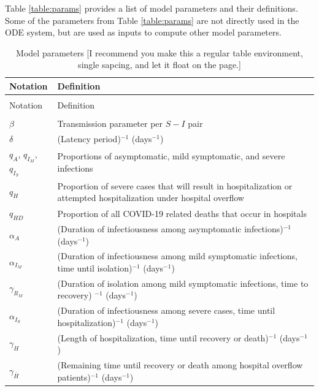 \documentclass[11pt]{article}
\newcommand{\comments}[1]{[\textcolor{red}{#1}]}
\begin{document}
Table \ref{table:params} provides a list of model parameters and their definitions. Some of the parameters from Table \ref{table:params} are not directly used in the ODE system, but are used as inputs to compute other model parameters. \\ 
\comments{Add the rest of parameters here, including intervention effects}

\begin{longtable} {p{} p{} }
	\caption{Model parameters [I recommend you make this a regular table environment, single sapcing, and let it float on the page.]} \\
	Notation & Definition \\[0.5em] \hline
	{} & {} \\
	\endfirsthead
	Notation & Definition  \\[0.5em] \hline
	\endhead
	{} & {}  \\[-1em]
	$\beta$ & Transmission parameter per $S-I$ pair \\[0.5em]
	$\delta$ & (Latency period)$^{-1}$ (days$^{-1}$) \\[0.5em]
	$q_A$, $q_{I_M}$, $q_{I_S}$  & Proportions of asymptomatic, mild symptomatic, and severe infections \\[0.5em]
	$q_H$ & Proportion of severe cases that will result in hospitalization or attempted hospitalization under hospital overflow \\ [0.5em]
	$q_{HD}$ & Proportion of all COVID-19 related deaths that occur in hospitals \\ [0.5em]
	$\alpha_A$ & (Duration of infectiousness among asymptomatic infections)$^{-1}$ (days$^{-1}$) \\[0.5em]	
	$\alpha_{I_M}$ & (Duration of infectiousness among mild symptomatic infections, time until isolation)$^{-1}$ (days$^{-1}$) \\[0.5em]
	$\gamma_{R_M}$ & (Duration of isolation among mild symptomatic infections, time to recovery)	$^{-1}$ (days$^{-1}$) \\[0.5em]
	$\alpha_{I_S}$ & (Duration of infectiousness among severe cases, time until hospitalization)$^{-1}$ (days$^{-1}$) \\[0.5em]	
	$\gamma_{H}$ & (Length of hospitalization, time until recovery or death)$^{-1}$ (days$^{-1}$) \\[0.5em]
	$\gamma_{\bar{H}}$ & (Remaining time until recovery or death among hospital overflow patients)$^{-1}$ (days$^{-1}$) \\[0.5em]

\end{longtable}
\end{document}
